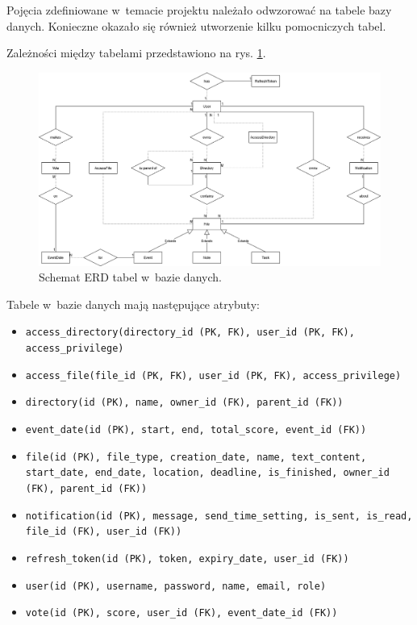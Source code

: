 \documentclass[a4paper,twoside,12pt]{book}
\begin{document}
Pojęcia zdefiniowane w~temacie projektu należało odwzorować na tabele bazy danych. Konieczne okazało się również utworzenie kilku pomocniczych tabel.

Zależności między tabelami przedstawiono na rys. \ref{fig:erd}.

\begin{figure}
\centering
\includegraphics[width=\textwidth]{./ERD.png}
\caption{Schemat ERD tabel w~bazie danych.}
\label{fig:erd}
\end{figure}

Tabele w~bazie danych mają następujące atrybuty:
\begin{itemize}
	\item \texttt{access_directory(directory_id (PK, FK), user_id (PK, FK), access_privilege)} 
	\item \texttt{access_file(file_id (PK, FK), user_id (PK, FK), access_privilege)} 
	\item \texttt{directory(id (PK), name, owner_id (FK), parent_id (FK))} 
	\item \texttt{event_date(id (PK), start, end, total_score, event_id (FK))} 
	\item \texttt{file(id (PK), file_type, creation_date, name, text_content, start_date, end_date, location, deadline, is_finished, owner_id (FK), parent_id (FK))}
	\item \texttt{notification(id (PK), message, send_time_setting, is_sent, is_read, file_id (FK), user_id (FK))}
	\item \texttt{refresh_token(id (PK), token, expiry_date, user_id (FK))}
	\item \texttt{user(id (PK), username, password, name, email, role)}
	\item \texttt{vote(id (PK), score, user_id (FK), event_date_id (FK))}
\end{itemize}
\end{document}
